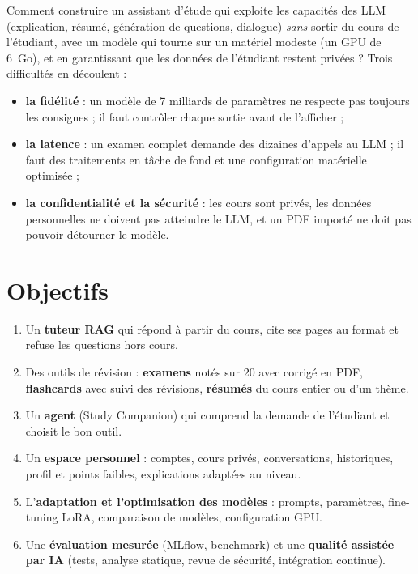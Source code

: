 \documentclass[12pt,a4paper]{report}
\DeclareRobustCommand{\code}[1]{\texttt{\codecasse{#1}}}
\begin{document}
Comment construire un assistant d'étude qui exploite les capacités des LLM (explication, résumé,
génération de questions, dialogue) \emph{sans} sortir du cours de l'étudiant, avec un modèle qui tourne
sur un matériel modeste (un GPU de 6~Go), et en garantissant que les données de l'étudiant restent
privées ? Trois difficultés en découlent :
\begin{itemize}
  \item \textbf{la fidélité} : un modèle de 7 milliards de paramètres ne respecte pas toujours les
        consignes ; il faut contrôler chaque sortie avant de l'afficher ;
  \item \textbf{la latence} : un examen complet demande des dizaines d'appels au LLM ; il faut des
        traitements en tâche de fond et une configuration matérielle optimisée ;
  \item \textbf{la confidentialité et la sécurité} : les cours sont privés, les données personnelles ne
        doivent pas atteindre le LLM, et un PDF importé ne doit pas pouvoir détourner le modèle.
\end{itemize}

\section{Objectifs}

\begin{enumerate}
  \item Un \textbf{tuteur RAG} qui répond à partir du cours, cite ses pages au format \code{[p.X]} et
        refuse les questions hors cours.
  \item Des outils de révision : \textbf{examens} notés sur 20 avec corrigé en PDF, \textbf{flashcards}
        avec suivi des révisions, \textbf{résumés} du cours entier ou d'un thème.
  \item Un \textbf{agent} (Study Companion) qui comprend la demande de l'étudiant et choisit le bon outil.
  \item Un \textbf{espace personnel} : comptes, cours privés, conversations, historiques, profil et
        points faibles, explications adaptées au niveau.
  \item L'\textbf{adaptation et l'optimisation des modèles} : prompts, paramètres, fine-tuning LoRA,
        comparaison de modèles, configuration GPU.
  \item Une \textbf{évaluation mesurée} (MLflow, benchmark) et une \textbf{qualité assistée par IA}
        (tests, analyse statique, revue de sécurité, intégration continue).
\end{enumerate}
\end{document}
